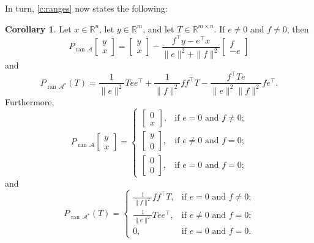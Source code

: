 \documentclass[12pt]{article}
\newcommand{\RR}{\ensuremath{\mathbb R}}
\newcommand{\ran}{\ensuremath{{\operatorname{ran}}\,}}
\theoremstyle{definition}
\newtheorem{corollary}[theorem]{Corollary}
\providecommand{\RR}{\mathbb{R}}
\providecommand{\ran}{\operatorname{ran}}
\providecommand{\ran}{\operatorname{ran}}
\providecommand{\RR}{\mathbb{R}}
\providecommand{\mA}{\mathcal{A}}
\begin{document}
{In turn, \cref{c:ranges} now states the following:
\begin{corollary}
Let $x\in\RR^n$, let $y\in\RR^m$, and let $T\in\RR^{m\times n}$.
If $e\neq 0$ and $f\neq 0$, then 
\begin{equation}
P_{\ran \mA}\begin{bmatrix}y\\x\end{bmatrix}
= \begin{bmatrix}
y\\ x
\end{bmatrix}
-\frac{f^\intercal y - e^\intercal x}{\|e\|^2+\|f\|^2}
\begin{bmatrix}
f\\ -e
\end{bmatrix}
\end{equation}
and 
\begin{equation}
P_{\ran \mA^*}(T)
= \frac{1}{\|e\|^2}Tee^\intercal 
+ \frac{1}{\|f\|^2}ff^\intercal T
-\frac{f^\intercal Te}{\|e\|^2\|f\|^2}fe^\intercal.
\end{equation}
Furthermore, 
\begin{equation}
P_{\ran \mA}\begin{bmatrix}y \\ x \end{bmatrix} =
\begin{cases}
\begin{bmatrix}0\\[-2mm]x\end{bmatrix}, &\text{if $e=0$ and $f\neq 0$;}\\[+4mm]
\begin{bmatrix}y\\[-1mm]0\end{bmatrix},  &\text{if $e\neq 0$ and $f= 0$;}\\[+4mm] 
\begin{bmatrix}0\\[-2mm]0\end{bmatrix}, &\text{if $e=0$ and $f= 0$;}
\end{cases}
\end{equation}
and 
\begin{equation}
P_{\ran \mA^*}(T) = 
\begin{cases}
\displaystyle \frac{1}{\|f\|^2}ff^\intercal T, &\text{if $e=0$ and $f\neq 0$;}\\[+4mm]
\displaystyle \frac{1}{\|e\|^2}Tee^\intercal, &\text{if $e\neq 0$ and $f= 0$;}\\[+4mm]
0, &\text{if $e=0$ and $f= 0$.}
\end{cases}
\end{equation}
\end{corollary}

}
\end{document}
